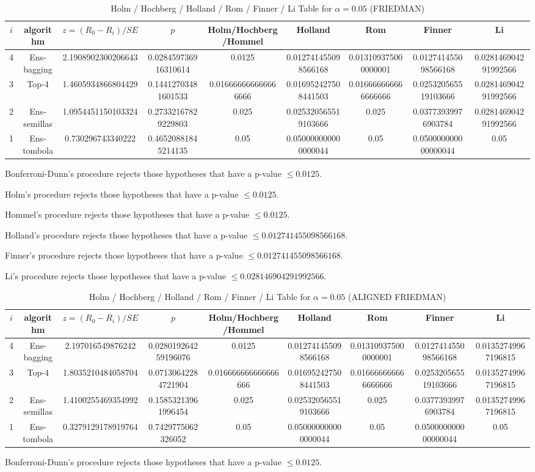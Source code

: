 \documentclass[a4paper,10pt]{article}
\begin{document}
\begin{landscape}
\begin{table}[!htp]
\centering\scriptsize
\caption{Holm / Hochberg / Holland / Rom / Finner / Li Table for $\alpha=0.05$ (FRIEDMAN)}
\begin{tabular}{ccccccccc}
$i$&algorithm&$z=(R_0 - R_i)/SE$&$p$&Holm/Hochberg/Hommel&Holland&Rom&Finner&Li\\
\hline
4&Ens-bagging&2.1908902300206643&0.028459736916310614&0.0125&0.012741455098566168&0.013109375000000001&0.012741455098566168&0.028146904291992566\\
3&Top-4&1.4605934866804429&0.14412703481601533&0.016666666666666666&0.016952427508441503&0.016666666666666666&0.025320565519103666&0.028146904291992566\\
2&Ens-semillas&1.0954451150103324&0.27332167829229803&0.025&0.025320565519103666&0.025&0.03773939976903784&0.028146904291992566\\
1&Ens-tombola&0.730296743340222&0.46520881845214135&0.05&0.050000000000000044&0.05&0.050000000000000044&0.05\\
\hline
\end{tabular}
\end{table}
Bonferroni-Dunn's procedure rejects those hypotheses that have a p-value $\le0.0125$.


Holm's procedure rejects those hypotheses that have a p-value $\le0.0125$.


Hommel's procedure rejects those hypotheses that have a p-value $\le0.0125$.


Holland's procedure rejects those hypotheses that have a p-value $\le0.012741455098566168$.


Finner's procedure rejects those hypotheses that have a p-value $\le0.012741455098566168$.


Li's procedure rejects those hypotheses that have a p-value $\le0.028146904291992566$.



\newpage

\begin{table}[!htp]
\centering\scriptsize
\caption{Holm / Hochberg / Holland / Rom / Finner / Li Table for $\alpha=0.05$ (ALIGNED FRIEDMAN)}
\begin{tabular}{ccccccccc}
$i$&algorithm&$z=(R_0 - R_i)/SE$&$p$&Holm/Hochberg/Hommel&Holland&Rom&Finner&Li\\
\hline
4&Ens-bagging&2.197016549876242&0.028019264259196076&0.0125&0.012741455098566168&0.013109375000000001&0.012741455098566168&0.01352749967196815\\
3&Top-4&1.8035210484058704&0.07130642284721904&0.016666666666666666&0.016952427508441503&0.016666666666666666&0.025320565519103666&0.01352749967196815\\
2&Ens-semillas&1.4100255469354992&0.15853213961996454&0.025&0.025320565519103666&0.025&0.03773939976903784&0.01352749967196815\\
1&Ens-tombola&0.3279129178919764&0.7429775062326052&0.05&0.050000000000000044&0.05&0.050000000000000044&0.05\\
\hline
\end{tabular}
\end{table}
Bonferroni-Dunn's procedure rejects those hypotheses that have a p-value $\le0.0125$.



\end{landscape}
\end{document}
